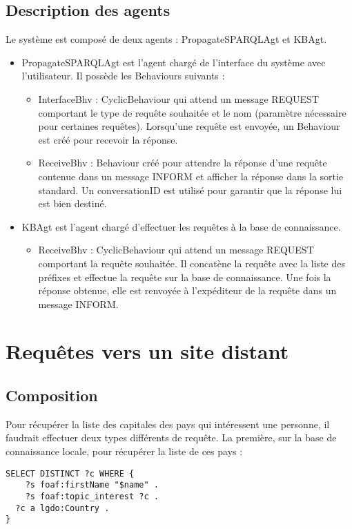 \documentclass[a4paper,11pt]{article}
\begin{document}
\subsection{Description des agents}
Le système est composé de deux agents : PropagateSPARQLAgt et KBAgt.
\begin{itemize}
\item PropagateSPARQLAgt est l'agent chargé de l'interface du système avec l'utilisateur. Il possède les Behaviours suivants :
	\begin{itemize}
		\item InterfaceBhv : CyclicBehaviour qui attend un message REQUEST comportant le type de requête souhaitée et le nom (paramètre nécessaire pour certaines requêtes). Lorsqu'une requête est envoyée, un Behaviour est créé pour recevoir la réponse.
		\item ReceiveBhv : Behaviour créé pour attendre la réponse d'une requête contenue dans un message INFORM et afficher la réponse dans la sortie standard. Un conversationID est utilisé pour garantir que la réponse lui est bien destiné.
	\end{itemize}
\item KBAgt est l'agent chargé d'effectuer les requêtes à la base de connaissance.
	\begin{itemize}
		\item ReceiveBhv : CyclicBehaviour qui attend un message REQUEST comportant la requête souhaitée. Il concatène la requête avec la liste des préfixes et effectue la requête sur la base de connaissance. Une fois la réponse obtenue, elle est renvoyée à l'expéditeur de la requête dans un message INFORM.
	\end{itemize}
\end{itemize}

\section{Requêtes vers un site distant}
\subsection{Composition}
Pour récupérer la liste des capitales des pays qui intéressent une personne, il faudrait effectuer deux types différents de requête.
La première, sur la base de connaissance locale, pour récupérer la liste de ces pays :
\begin{lstlisting}[language=SPARQL]
SELECT DISTINCT ?c WHERE {
	?s foaf:firstName "$name" .
	?s foaf:topic_interest ?c .
  ?c a lgdo:Country .
}
\end{lstlisting}
\end{document}

